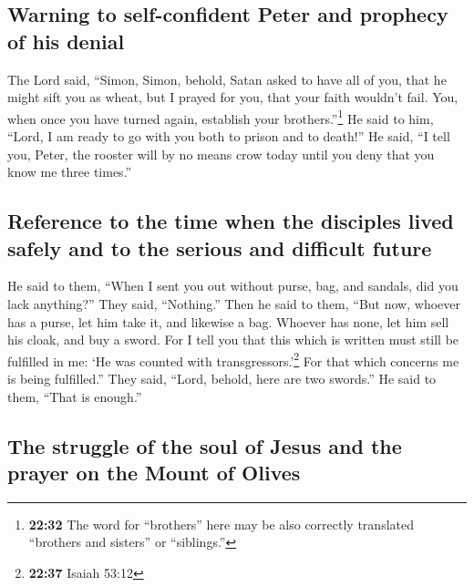 \begin{paracol}{2}
\begin{otherlanguage}{english}
\begin{otherlanguage}{english}
\hypertarget{warning-to-self-confident-peter-and-prophecy-of-his-denial}{%
\subsection{Warning to self-confident Peter and prophecy of his
denial}\label{warning-to-self-confident-peter-and-prophecy-of-his-denial}}

 The Lord said, ``Simon, Simon, behold, Satan asked to
have all of you, that he might sift you as wheat,  but I
prayed for you, that your faith wouldn't fail. You, when once you have
turned again, establish your brothers.''\footnote{\textbf{22:32} The
  word for ``brothers'' here may be also correctly translated ``brothers
  and sisters'' or ``siblings.''}  He said to him,
``Lord, I am ready to go with you both to prison and to death!''
 He said, ``I tell you, Peter, the rooster will by no
means crow today until you deny that you know me three times.''

\hypertarget{reference-to-the-time-when-the-disciples-lived-safely-and-to-the-serious-and-difficult-future}{%
\subsection{Reference to the time when the disciples lived safely and to
the serious and difficult
future}\label{reference-to-the-time-when-the-disciples-lived-safely-and-to-the-serious-and-difficult-future}}

 He said to them, ``When I sent you out without purse,
bag, and sandals, did you lack anything?'' They said, ``Nothing.''
 Then he said to them, ``But now, whoever has a purse,
let him take it, and likewise a bag. Whoever has none, let him sell his
cloak, and buy a sword.  For I tell you that this which
is written must still be fulfilled in me: `He was counted with
transgressors.'\footnote{\textbf{22:37} Isaiah 53:12} For that which
concerns me is being fulfilled.''  They said, ``Lord,
behold, here are two swords.'' He said to them, ``That is enough.''

\hypertarget{the-struggle-of-the-soul-of-jesus-and-the-prayer-on-the-mount-of-olives}{%
\subsection{The struggle of the soul of Jesus and the prayer on the
Mount of
Olives}\label{the-struggle-of-the-soul-of-jesus-and-the-prayer-on-the-mount-of-olives}}


\end{otherlanguage}
\end{otherlanguage}
\end{paracol}
